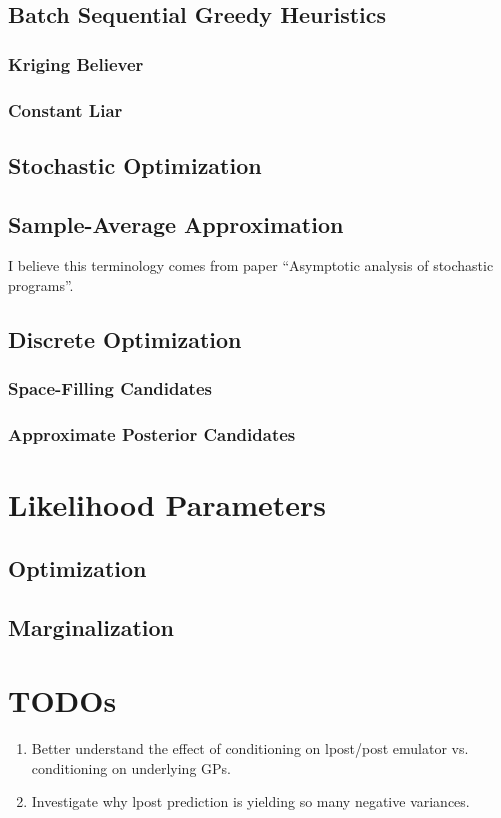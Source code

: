 \documentclass[12pt]{article}
\begin{document}
\subsection{Batch Sequential Greedy Heuristics}
\subsubsection{Kriging Believer}
\subsubsection{Constant Liar}
\subsection{Stochastic Optimization}
\subsection{Sample-Average Approximation}
I believe this terminology comes from paper ``Asymptotic analysis of stochastic programs''. 
\subsection{Discrete Optimization}
\subsubsection{Space-Filling Candidates}
\subsubsection{Approximate Posterior Candidates}

\section{Likelihood Parameters}
\subsection{Optimization}
\subsection{Marginalization}

\section{TODOs}
\begin{enumerate}
\item Better understand the effect of conditioning on lpost/post emulator vs. conditioning on underlying GPs. 
\item Investigate why lpost prediction is yielding so many negative variances. 
\end{enumerate}
\end{document}
